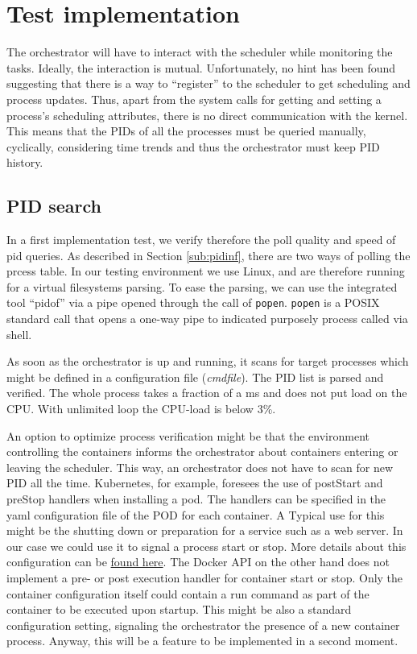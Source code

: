 \documentclass[]{scrartcl}
\begin{document}
\section{Test implementation}

The orchestrator will have to interact with the scheduler while monitoring the tasks. 
Ideally, the interaction is mutual. Unfortunately, no hint has been found suggesting that there is a way to ``register'' to the scheduler to get scheduling and process updates. 
Thus, apart from the system calls for getting and setting a process's scheduling attributes, there is no direct communication with the kernel. 
This means that the PIDs of all the processes must be queried manually, cyclically, considering time trends and thus the orchestrator must keep PID history. 

\subsection{PID search}

In a first implementation test, we verify therefore the poll quality and speed of pid queries.
As described in Section \ref{sub:pidinf}, there are two ways of polling the prcess table. 
In our testing environment we use Linux, and are therefore running for a virtual filesystems parsing. 
To ease the parsing, we can use the integrated tool ``pidof'' via a pipe opened through the call of \texttt{popen}.
\texttt{popen} is a POSIX standard call that opens a one-way pipe to indicated  purposely process called via shell.

As soon as the orchestrator is up and running, it scans for target processes which might be  defined in a configuration file (\textit{cmdfile}).
The PID list is parsed and verified. 
The whole process takes a fraction of a ms and does not put load on the {CPU}. With unlimited loop the {CPU}-load is below 3\%.

An option to optimize process verification might be that the environment controlling the containers informs the orchestrator about containers entering or leaving the scheduler.
This way, an orchestrator does not have to scan for new PID all the time.
Kubernetes, for example, foresees the use of postStart and preStop handlers when installing a pod. 
The handlers can be specified in the yaml configuration file of the POD for each container. A Typical use for this might be the shutting down or preparation for a service such as a web server. 
In our case we could use it to signal a process start or stop.
More details about this configuration can be \href{{https://kubernetes.io/docs/tasks/configure-pod-container/attach-handler-lifecycle-event/}}{found here}.
The Docker API on the other hand does not implement a pre- or post execution handler for container start or stop. 
Only the container configuration itself could contain a run command as part of the container to be executed upon startup. This might be also a standard configuration setting, signaling the orchestrator the presence of a new container process.
Anyway, this will be a feature to be implemented in a second moment.
\end{document}
